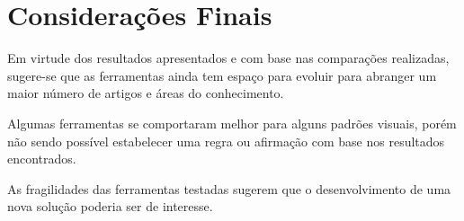 \section{Considerações Finais}
\label{sec:final-considerations}

Em virtude dos resultados apresentados e com base nas comparações realizadas, sugere-se que as ferramentas ainda tem espaço para evoluir para abranger um maior número de artigos e áreas do conhecimento.
 
Algumas ferramentas se comportaram melhor para alguns padrões visuais, porém não sendo possível estabelecer uma regra ou afirmação com base nos resultados encontrados.

As fragilidades das ferramentas testadas sugerem que o desenvolvimento de uma nova solução poderia ser de interesse.

